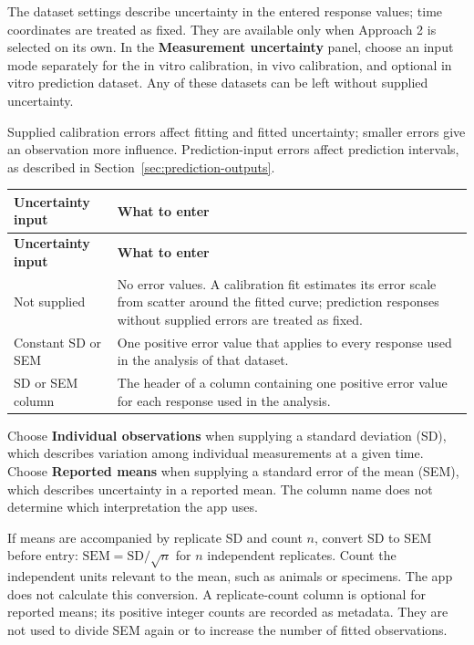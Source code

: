 The dataset settings describe uncertainty in the entered response values; time coordinates are treated as fixed. They are available only when Approach 2 is selected on its own. In the \textbf{Measurement uncertainty} panel, choose an input mode separately for the in vitro calibration, in vivo calibration, and optional in vitro prediction dataset. Any of these datasets can be left without supplied uncertainty.

Supplied calibration errors affect fitting and fitted uncertainty; smaller errors give an observation more influence. Prediction-input errors affect prediction intervals, as described in Section~\ref{sec:prediction-outputs}.

\begin{longtable}{@{}>{\raggedright\arraybackslash}p{}>{\raggedright\arraybackslash}p{}@{}}
\toprule
\textbf{Uncertainty input} & \textbf{What to enter} \\
\midrule
\endfirsthead
\toprule
\textbf{Uncertainty input} & \textbf{What to enter} \\
\midrule
\endhead
Not supplied & No error values. A calibration fit estimates its error scale from scatter around the fitted curve; prediction responses without supplied errors are treated as fixed. \\
Constant SD or SEM & One positive error value that applies to every response used in the analysis of that dataset. \\
SD or SEM column & The header of a column containing one positive error value for each response used in the analysis. \\
\bottomrule
\end{longtable}

Choose \textbf{Individual observations} when supplying a standard deviation (SD), which describes variation among individual measurements at a given time. Choose \textbf{Reported means} when supplying a standard error of the mean (SEM), which describes uncertainty in a reported mean. The column name does not determine which interpretation the app uses.

If means are accompanied by replicate SD and count $n$, convert SD to SEM before entry: $\mathrm{SEM}=\mathrm{SD}/\sqrt{n}$ for $n$ independent replicates. Count the independent units relevant to the mean, such as animals or specimens. The app does not calculate this conversion. A replicate-count column is optional for reported means; its positive integer counts are recorded as metadata. They are not used to divide SEM again or to increase the number of fitted observations.

